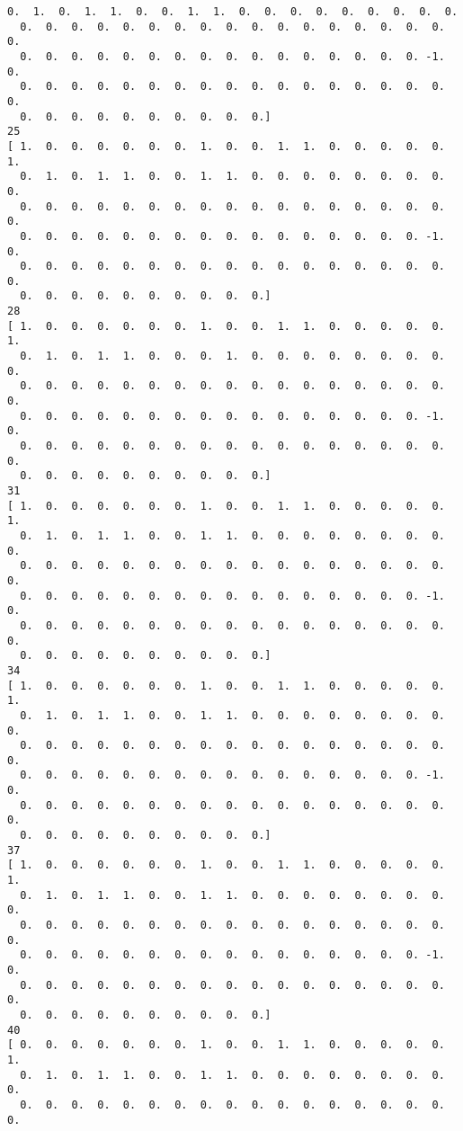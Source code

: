 \documentclass[11pt]{article}
\begin{document}
\begin{Verbatim}[commandchars=\\\{\}]
  0.  1.  0.  1.  1.  0.  0.  1.  1.  0.  0.  0.  0.  0.  0.  0.  0.  0.
  0.  0.  0.  0.  0.  0.  0.  0.  0.  0.  0.  0.  0.  0.  0.  0.  0.  0.
  0.  0.  0.  0.  0.  0.  0.  0.  0.  0.  0.  0.  0.  0.  0.  0. -1.  0.
  0.  0.  0.  0.  0.  0.  0.  0.  0.  0.  0.  0.  0.  0.  0.  0.  0.  0.
  0.  0.  0.  0.  0.  0.  0.  0.  0.  0.]
25
[ 1.  0.  0.  0.  0.  0.  0.  1.  0.  0.  1.  1.  0.  0.  0.  0.  0.  1.
  0.  1.  0.  1.  1.  0.  0.  1.  1.  0.  0.  0.  0.  0.  0.  0.  0.  0.
  0.  0.  0.  0.  0.  0.  0.  0.  0.  0.  0.  0.  0.  0.  0.  0.  0.  0.
  0.  0.  0.  0.  0.  0.  0.  0.  0.  0.  0.  0.  0.  0.  0.  0. -1.  0.
  0.  0.  0.  0.  0.  0.  0.  0.  0.  0.  0.  0.  0.  0.  0.  0.  0.  0.
  0.  0.  0.  0.  0.  0.  0.  0.  0.  0.]
28
[ 1.  0.  0.  0.  0.  0.  0.  1.  0.  0.  1.  1.  0.  0.  0.  0.  0.  1.
  0.  1.  0.  1.  1.  0.  0.  0.  1.  0.  0.  0.  0.  0.  0.  0.  0.  0.
  0.  0.  0.  0.  0.  0.  0.  0.  0.  0.  0.  0.  0.  0.  0.  0.  0.  0.
  0.  0.  0.  0.  0.  0.  0.  0.  0.  0.  0.  0.  0.  0.  0.  0. -1.  0.
  0.  0.  0.  0.  0.  0.  0.  0.  0.  0.  0.  0.  0.  0.  0.  0.  0.  0.
  0.  0.  0.  0.  0.  0.  0.  0.  0.  0.]
31
[ 1.  0.  0.  0.  0.  0.  0.  1.  0.  0.  1.  1.  0.  0.  0.  0.  0.  1.
  0.  1.  0.  1.  1.  0.  0.  1.  1.  0.  0.  0.  0.  0.  0.  0.  0.  0.
  0.  0.  0.  0.  0.  0.  0.  0.  0.  0.  0.  0.  0.  0.  0.  0.  0.  0.
  0.  0.  0.  0.  0.  0.  0.  0.  0.  0.  0.  0.  0.  0.  0.  0. -1.  0.
  0.  0.  0.  0.  0.  0.  0.  0.  0.  0.  0.  0.  0.  0.  0.  0.  0.  0.
  0.  0.  0.  0.  0.  0.  0.  0.  0.  0.]
34
[ 1.  0.  0.  0.  0.  0.  0.  1.  0.  0.  1.  1.  0.  0.  0.  0.  0.  1.
  0.  1.  0.  1.  1.  0.  0.  1.  1.  0.  0.  0.  0.  0.  0.  0.  0.  0.
  0.  0.  0.  0.  0.  0.  0.  0.  0.  0.  0.  0.  0.  0.  0.  0.  0.  0.
  0.  0.  0.  0.  0.  0.  0.  0.  0.  0.  0.  0.  0.  0.  0.  0. -1.  0.
  0.  0.  0.  0.  0.  0.  0.  0.  0.  0.  0.  0.  0.  0.  0.  0.  0.  0.
  0.  0.  0.  0.  0.  0.  0.  0.  0.  0.]
37
[ 1.  0.  0.  0.  0.  0.  0.  1.  0.  0.  1.  1.  0.  0.  0.  0.  0.  1.
  0.  1.  0.  1.  1.  0.  0.  1.  1.  0.  0.  0.  0.  0.  0.  0.  0.  0.
  0.  0.  0.  0.  0.  0.  0.  0.  0.  0.  0.  0.  0.  0.  0.  0.  0.  0.
  0.  0.  0.  0.  0.  0.  0.  0.  0.  0.  0.  0.  0.  0.  0.  0. -1.  0.
  0.  0.  0.  0.  0.  0.  0.  0.  0.  0.  0.  0.  0.  0.  0.  0.  0.  0.
  0.  0.  0.  0.  0.  0.  0.  0.  0.  0.]
40
[ 0.  0.  0.  0.  0.  0.  0.  1.  0.  0.  1.  1.  0.  0.  0.  0.  0.  1.
  0.  1.  0.  1.  1.  0.  0.  1.  1.  0.  0.  0.  0.  0.  0.  0.  0.  0.
  0.  0.  0.  0.  0.  0.  0.  0.  0.  0.  0.  0.  0.  0.  0.  0.  0.  0.

\end{Verbatim}
\end{document}
